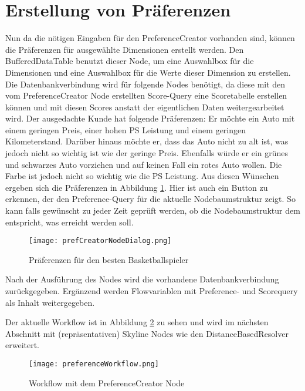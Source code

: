 \section{Erstellung von Präferenzen}
\label{ch:Evaluierung:sec:createPref}
Nun da die nötigen Eingaben für den PreferenceCreator vorhanden sind, können die Präferenzen für ausgewählte Dimensionen erstellt werden. Den BufferedDataTable benutzt dieser Node, um eine Auswahlbox für die Dimensionen und eine Auswahlbox für die Werte dieser Dimension zu erstellen. Die Datenbankverbindung wird für folgende Nodes benötigt, da diese mit den vom PreferenceCreator Node erstellten Score-Query eine Scoretabelle erstellen können und mit diesen Scores anstatt der eigentlichen Daten weitergearbeitet wird. 
Der ausgedachte Kunde hat folgende Präferenzen: Er möchte ein Auto mit einem geringen Preis, einer hohen PS Leistung und einem geringen Kilometerstand. Darüber hinaus möchte er, dass das Auto nicht zu alt ist, was jedoch nicht so wichtig ist wie der geringe Preis. Ebenfalls würde er ein grünes und schwarzes Auto vorziehen und auf keinen Fall ein rotes Auto wollen. Die Farbe ist jedoch nicht so wichtig wie die PS Leistung. Aus diesen Wünschen ergeben sich die Präferenzen in Abbildung \ref{img:useCaseNodeDialog}. Hier ist auch ein Button zu erkennen, der den Preference-Query für die aktuelle Nodebaumstruktur zeigt. So kann falls gewünscht zu jeder Zeit geprüft werden, ob die Nodebaumstruktur dem entspricht, was erreicht werden soll. 

\begin{figure}[H]
	\centering
	\texttt{[image: prefCreatorNodeDialog.png]}
	\caption{Präferenzen für den besten Basketballspieler}
	\label{img:useCaseNodeDialog}
\end{figure} 

Nach der Ausführung des Nodes wird die vorhandene Datenbankverbindung zurückgegeben. Ergänzend werden Flowvariablen mit Preference- und Scorequery als Inhalt weitergegeben. 

Der aktuelle Workflow ist in Abbildung \ref{img:preferenceWorkflow} zu sehen und wird im nächsten Abschnitt mit (repräsentativen) Skyline Nodes wie den DistanceBasedResolver erweitert. 

\begin{figure}[H]
	\centering
	\texttt{[image: preferenceWorkflow.png]}
	\caption{Workflow mit dem PreferenceCreator Node}
	\label{img:preferenceWorkflow}
\end{figure}  
